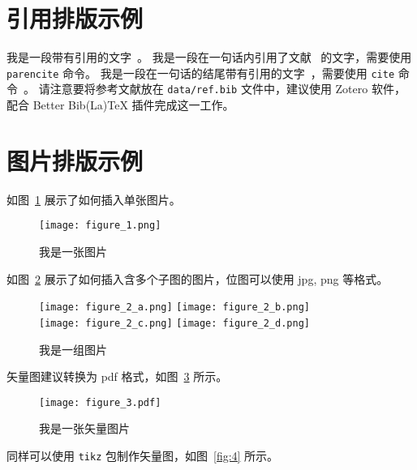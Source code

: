 \section{引用排版示例}
\label{sec:intro:reference}
我是一段带有引用的文字~\cite{IEEE1363}。
我是一段在一句话内引用了文献~\parencite{Jeyakumar2004} 的文字，需要使用 \verb|parencite| 命令。
我是一段在一句话的结尾带有引用的文字~\cite{ElIdrissi1994}，需要使用 \verb|cite| 命令~\cite{You2024}。
请注意要将参考文献放在 \verb|data/ref.bib| 文件中，建议使用 Zotero 软件，配合 Better Bib(La)TeX 插件完成这一工作。

\section{图片排版示例}
\label{sec:intro:figure}
如图~\ref{fig:1} 展示了如何插入单张图片。
\begin{figure}[ht] %
    \centering \texttt{[image: figure\_1.png]}
    \caption{我是一张图片} \label{fig:1}
\end{figure}
如图~\ref{fig:2} 展示了如何插入含多个子图的图片，位图可以使用 jpg, png 等格式。
\begin{figure}[ht] \centering
      {\texttt{[image: figure\_2\_a.png]}} \hspace{2em} %
      {\texttt{[image: figure\_2\_b.png]}} \\ \vspace{1em} %
      {\texttt{[image: figure\_2\_c.png]}} \hspace{2em} %
      {\texttt{[image: figure\_2\_d.png]}}
    \caption{我是一组图片} \label{fig:2}
\end{figure}
矢量图建议转换为 pdf 格式，如图~\ref{fig:3} 所示。
\begin{figure}[ht] \centering
    \texttt{[image: figure\_3.pdf]}
    \caption{我是一张矢量图片} \label{fig:3}
\end{figure}
同样可以使用 \verb|tikz| 包制作矢量图，如图~\ref{fig:4} 所示。
